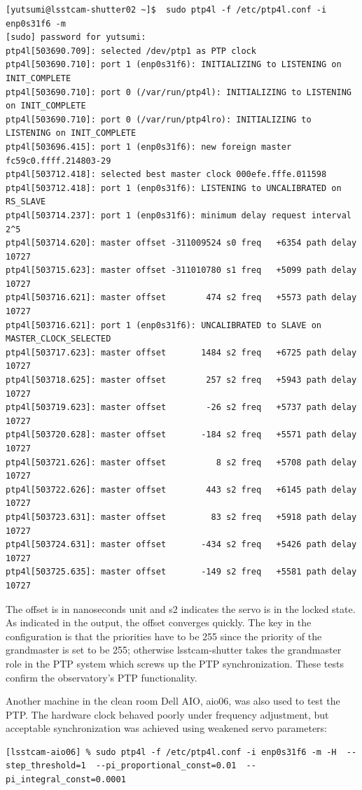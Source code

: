 \begin{lstlisting}
[yutsumi@lsstcam-shutter02 ~]$  sudo ptp4l -f /etc/ptp4l.conf -i enp0s31f6 -m
[sudo] password for yutsumi: 
ptp4l[503690.709]: selected /dev/ptp1 as PTP clock
ptp4l[503690.710]: port 1 (enp0s31f6): INITIALIZING to LISTENING on INIT_COMPLETE
ptp4l[503690.710]: port 0 (/var/run/ptp4l): INITIALIZING to LISTENING on INIT_COMPLETE
ptp4l[503690.710]: port 0 (/var/run/ptp4lro): INITIALIZING to LISTENING on INIT_COMPLETE
ptp4l[503696.415]: port 1 (enp0s31f6): new foreign master fc59c0.ffff.214803-29
ptp4l[503712.418]: selected best master clock 000efe.fffe.011598
ptp4l[503712.418]: port 1 (enp0s31f6): LISTENING to UNCALIBRATED on RS_SLAVE
ptp4l[503714.237]: port 1 (enp0s31f6): minimum delay request interval 2^5
ptp4l[503714.620]: master offset -311009524 s0 freq   +6354 path delay     10727
ptp4l[503715.623]: master offset -311010780 s1 freq   +5099 path delay     10727
ptp4l[503716.621]: master offset        474 s2 freq   +5573 path delay     10727
ptp4l[503716.621]: port 1 (enp0s31f6): UNCALIBRATED to SLAVE on MASTER_CLOCK_SELECTED
ptp4l[503717.623]: master offset       1484 s2 freq   +6725 path delay     10727
ptp4l[503718.625]: master offset        257 s2 freq   +5943 path delay     10727
ptp4l[503719.623]: master offset        -26 s2 freq   +5737 path delay     10727
ptp4l[503720.628]: master offset       -184 s2 freq   +5571 path delay     10727
ptp4l[503721.626]: master offset          8 s2 freq   +5708 path delay     10727
ptp4l[503722.626]: master offset        443 s2 freq   +6145 path delay     10727
ptp4l[503723.631]: master offset         83 s2 freq   +5918 path delay     10727
ptp4l[503724.631]: master offset       -434 s2 freq   +5426 path delay     10727
ptp4l[503725.635]: master offset       -149 s2 freq   +5581 path delay     10727
\end{lstlisting}
The offset is in nanoseconds unit and s2 indicates the servo is in the locked state. As indicated in the output, the offset converges quickly. The key in the configuration is that the priorities have to be 255 since the priority of the grandmaster is set to be 255; otherwise lsstcam-shutter takes the grandmaster role in the PTP system which screws up the PTP synchronization.
These tests confirm the observatory's PTP functionality.

Another machine in the clean room Dell AIO, aio06, was also used to test the PTP. The hardware clock behaved poorly under frequency adjustment, but acceptable synchronization was achieved using weakened servo parameters:
\begin{lstlisting}
[lsstcam-aio06] % sudo ptp4l -f /etc/ptp4l.conf -i enp0s31f6 -m -H  --step_threshold=1  --pi_proportional_const=0.01  --pi_integral_const=0.0001
\end{lstlisting}


